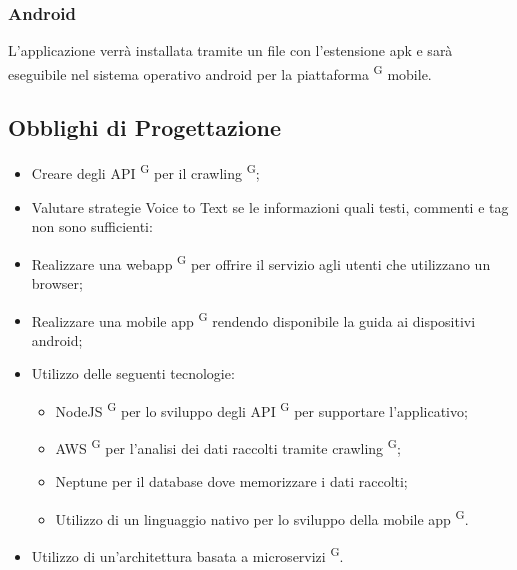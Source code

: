 \subsubsection{Android}
L'applicazione verrà installata tramite un file con l’estensione apk e sarà eseguibile nel sistema operativo android per la piattaforma \textsuperscript{G} mobile.

\subsection{Obblighi di Progettazione}
\begin{itemize}
  \item Creare degli API \textsuperscript{G} per il crawling \textsuperscript{G};
  \item Valutare strategie Voice to Text se le informazioni quali testi, commenti e tag non sono sufficienti:
  \item Realizzare una webapp \textsuperscript{G} per offrire il servizio agli utenti che utilizzano un browser;
  \item Realizzare una mobile app \textsuperscript{G} rendendo disponibile la guida ai dispositivi android;
  \item Utilizzo delle seguenti tecnologie: 
  \begin{itemize}
    \item NodeJS \textsuperscript{G} per lo sviluppo degli API \textsuperscript{G} per supportare l’applicativo;
    \item AWS \textsuperscript{G} per l'analisi dei dati raccolti tramite crawling \textsuperscript{G};
    \item Neptune per il database dove memorizzare i dati raccolti;
    \item Utilizzo di un linguaggio nativo per lo sviluppo della mobile app \textsuperscript{G}.
  \end{itemize}
  \item Utilizzo di un'architettura basata a microservizi \textsuperscript{G}.

\end{itemize}